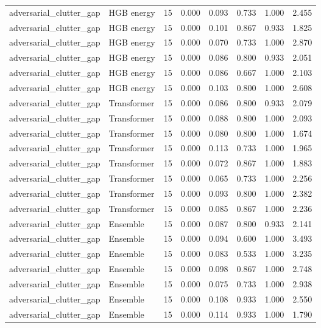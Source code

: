 {\begin{longtable}{llrrrrrr}
adversarial\_clutter\_gap & HGB energy & 15 & 0.000 & 0.093 & 0.733 & 1.000 & 2.455 \\
adversarial\_clutter\_gap & HGB energy & 15 & 0.000 & 0.101 & 0.867 & 0.933 & 1.825 \\
adversarial\_clutter\_gap & HGB energy & 15 & 0.000 & 0.070 & 0.733 & 1.000 & 2.870 \\
adversarial\_clutter\_gap & HGB energy & 15 & 0.000 & 0.086 & 0.800 & 0.933 & 2.051 \\
adversarial\_clutter\_gap & HGB energy & 15 & 0.000 & 0.086 & 0.667 & 1.000 & 2.103 \\
adversarial\_clutter\_gap & HGB energy & 15 & 0.000 & 0.103 & 0.800 & 1.000 & 2.608 \\
adversarial\_clutter\_gap & Transformer & 15 & 0.000 & 0.086 & 0.800 & 0.933 & 2.079 \\
adversarial\_clutter\_gap & Transformer & 15 & 0.000 & 0.088 & 0.800 & 1.000 & 2.093 \\
adversarial\_clutter\_gap & Transformer & 15 & 0.000 & 0.080 & 0.800 & 1.000 & 1.674 \\
adversarial\_clutter\_gap & Transformer & 15 & 0.000 & 0.113 & 0.733 & 1.000 & 1.965 \\
adversarial\_clutter\_gap & Transformer & 15 & 0.000 & 0.072 & 0.867 & 1.000 & 1.883 \\
adversarial\_clutter\_gap & Transformer & 15 & 0.000 & 0.065 & 0.733 & 1.000 & 2.256 \\
adversarial\_clutter\_gap & Transformer & 15 & 0.000 & 0.093 & 0.800 & 1.000 & 2.382 \\
adversarial\_clutter\_gap & Transformer & 15 & 0.000 & 0.085 & 0.867 & 1.000 & 2.236 \\
adversarial\_clutter\_gap & Ensemble & 15 & 0.000 & 0.087 & 0.800 & 0.933 & 2.141 \\
adversarial\_clutter\_gap & Ensemble & 15 & 0.000 & 0.094 & 0.600 & 1.000 & 3.493 \\
adversarial\_clutter\_gap & Ensemble & 15 & 0.000 & 0.083 & 0.533 & 1.000 & 3.235 \\
adversarial\_clutter\_gap & Ensemble & 15 & 0.000 & 0.098 & 0.867 & 1.000 & 2.748 \\
adversarial\_clutter\_gap & Ensemble & 15 & 0.000 & 0.075 & 0.733 & 1.000 & 2.938 \\
adversarial\_clutter\_gap & Ensemble & 15 & 0.000 & 0.108 & 0.933 & 1.000 & 2.550 \\
adversarial\_clutter\_gap & Ensemble & 15 & 0.000 & 0.114 & 0.933 & 1.000 & 1.790 \\

\end{longtable}}
